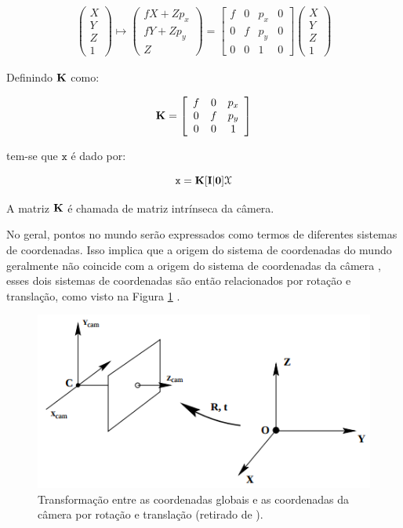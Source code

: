 {\begin{align}
\left(\begin{array}{c}
X\\
Y\\
Z\\
1
\end{array}\right) \mapsto
\left(\begin{array}{c}
fX + Zp_x\\
fY + Zp_y\\
Z
\end{array}\right) =
\left[\begin{array}{cccc}
f & 0 & p_x & 0\\
0 & f & p_y & 0\\
0 & 0 & 1 & 0
\end{array}\right]
\left(\begin{array}{c}
X\\
Y\\
Z\\
1
\end{array}\right)
\label{eq:3d_vetHomogeneo2}
\end{align}

Definindo $\bf{K}$ como:

\begin{align}
\bf{K} =
\left[\begin{array}{ccc}
f & 0 & p_x\\
0 & f & p_y\\
0 & 0 & 1
\end{array}\right]
\label{eq:3d_matIntrinseca}
\end{align}

tem-se que $\mathtt{x}$ é dado por:

\begin{equation}
\mathtt{x} = \bf{K}[\bf{I}|0]\mathcal{X}
\label{3d_camModel1}
\end{equation}

A matriz $\bf{K}$ é chamada de matriz intrínseca da câmera.

No geral, pontos no mundo serão expressados como termos de diferentes sistemas de coordenadas. Isso implica que a origem do sistema de coordenadas do mundo geralmente não coincide com a origem do sistema de coordenadas da câmera \cite{hartley2003multiple}, esses dois sistemas de coordenadas são então relacionados por rotação e translação, como visto na Figura \ref{fig:trans_rot} .

\begin{figure}[h!]
\centering
\includegraphics[width=.5\linewidth]{figs/TG_rot_tr.png}
\caption{Transformação entre as coordenadas globais e as coordenadas da câmera por rotação e translação (retirado de \cite{hartley2003multiple}).}
\label{fig:trans_rot}
\end{figure}

}
